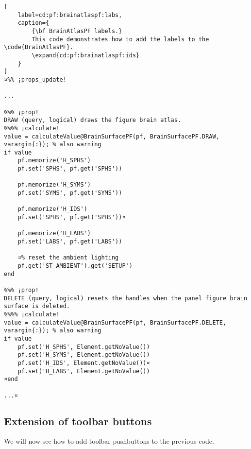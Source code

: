 \documentclass{tufte-handout}
\begin{document}
\begin{lstlisting}[
	label=cd:pf:brainatlaspf:labs,
	caption={
		{\bf BrainAtlasPF labels.}
		This code demonstrates how to add the labels to the \code{BrainAtlasPF}.
		\expand{cd:pf:brainatlaspf:ids}
	}
]
¤%% ¡props_update!

...

%%% ¡prop!
DRAW (query, logical) draws the figure brain atlas.
%%%% ¡calculate!
value = calculateValue@BrainSurfacePF(pf, BrainSurfacePF.DRAW, varargin{:}); % also warning
if value
    pf.memorize('H_SPHS')
    pf.set('SPHS', pf.get('SPHS'))

    pf.memorize('H_SYMS')
    pf.set('SYMS', pf.get('SYMS'))

    pf.memorize('H_IDS')
    pf.set('SPHS', pf.get('SPHS'))¤

    pf.memorize('H_LABS')
    pf.set('LABS', pf.get('LABS'))

    ¤% reset the ambient lighting
    pf.get('ST_AMBIENT').get('SETUP')
end

%%% ¡prop!
DELETE (query, logical) resets the handles when the panel figure brain surface is deleted.
%%%% ¡calculate!
value = calculateValue@BrainSurfacePF(pf, BrainSurfacePF.DELETE, varargin{:}); % also warning
if value
    pf.set('H_SPHS', Element.getNoValue())
    pf.set('H_SYMS', Element.getNoValue())
    pf.set('H_IDS', Element.getNoValue())¤
    pf.set('H_LABS', Element.getNoValue())
¤end

...¤
\end{lstlisting}

\subsection{Extension of toolbar buttons}

We will now see how to add toolbar pushbuttons to the previous code.
\end{document}
